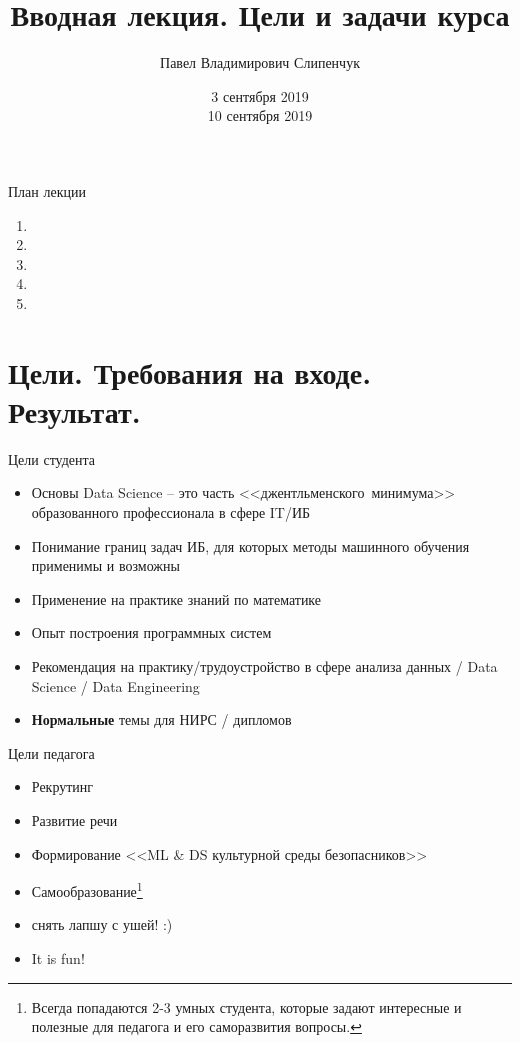 \documentclass{beamer}
\title{Вводная лекция. Цели и задачи курса}
\date{3 сентября 2019 \\ 10 сентября 2019}
\author{Павел Владимирович Слипенчук}
\institute{Москва, МГТУ им.Бауманка,\\ каф.ИУ-8, КИБ}
\begin{document}
  \maketitle
    
   \begin{frame}{План лекции}
   \begin{enumerate}
   	\item {}
   	\item {}
   		\item {}
   		\item {}
   		\item {}
   	\end{enumerate}
   \end{frame}
  
  
  \section{Цели. Требования на входе. Результат.}\label{section:goals}
    
  \begin{frame}{Цели студента}
  	\begin{itemize}
  		\item Основы Data Science -- это часть
  <<джентльменского~минимума>>
  образованного профессионала 
  в сфере IT/ИБ 
  		\item Понимание границ задач ИБ,
  для которых методы машинного обучения
  применимы и возможны
  		\item Применение на практике знаний
  по математике
  		\item Опыт построения программных систем
  		\item Рекомендация на практику/трудоустройство 
  в сфере анализа данных / Data Science / Data Engineering
  		\item \textbf{Нормальные} темы для НИРС / дипломов
  	\end{itemize}
  \end{frame}
  
     
  \begin{frame}{Цели педагога}
  	\begin{itemize}
  		\item Рекрутинг
  		\item Развитие речи
  		\item Формирование <<ML \& DS культурной среды безопасников>>
  		\item Самообразование\footnote{
  		Всегда попадаются 2-3 умных студента, которые задают интересные и полезные для педагога и его саморазвития вопросы.}
  	    \item снять лапшу с ушей! :)
  		\item It is fun!
	\end{itemize}
  \end{frame}
  
\end{document}
